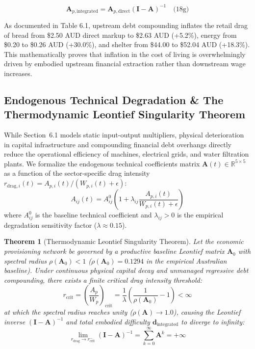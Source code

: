 \documentclass[preprint,12pt,authoryear]{elsarticle}
\newtheorem{theorem}{Theorem}
\theoremstyle{definition}
\begin{document}
$$\mathbf{A}_{p, \text{integrated}} = \mathbf{A}_{p, \text{direct}} (\mathbf{I} - \mathbf{A})^{-1} \quad \text{(18g)}$$

As documented in Table 6.1, upstream debt compounding inflates the retail drag of bread from \$2.50 AUD direct markup to \$2.63 AUD (+5.2\%), energy from \$0.20 to \$0.26 AUD (+30.0\%), and shelter from \$44.00 to \$52.04 AUD (+18.3\%). This mathematically proves that inflation in the cost of living is overwhelmingly driven by embodied upstream financial extraction rather than downstream wage increases.

\subsection{Endogenous Technical Degradation \& The Thermodynamic Leontief Singularity Theorem}

While Section~6.1 models static input-output multipliers, physical deterioration in capital infrastructure and compounding financial debt overhangs directly reduce the operational efficiency of machines, electrical grids, and water filtration plants. We formalize the endogenous technical coefficients matrix $\mathbf{A}(t) \in \mathbb{R}^{5 \times 5}$ as a function of the sector-specific drag intensity $r_{\text{drag}, i}(t) = A_{p,i}(t) / (W_{p,i}(t) + \epsilon)$:
\begin{equation}
A_{ij}(t) = A_{ij}^0 \left(1 + \lambda_{ij} \frac{A_{p,i}(t)}{W_{p,i}(t) + \epsilon}\right) \label{eq:endogenous_A}
\end{equation}
where $A_{ij}^0$ is the baseline technical coefficient and $\lambda_{ij} > 0$ is the empirical degradation sensitivity factor ($\lambda \approx 0.15$).

\begin{theorem}[Thermodynamic Leontief Singularity Theorem]
Let the economic provisioning network be governed by a productive baseline Leontief matrix $\mathbf{A}_0$ with spectral radius $\rho(\mathbf{A}_0) < 1$ ($\rho(\mathbf{A}_0) = 0.1294$ in the empirical Australian baseline). Under continuous physical capital decay and unmanaged regressive debt compounding, there exists a finite critical drag intensity threshold:
\begin{equation}
r_{\text{crit}} = \left(\frac{A_p}{W_p}\right)_{\text{crit}} = \frac{1}{\lambda} \left(\frac{1}{\rho(\mathbf{A}_0)} - 1\right) < \infty \label{eq:r_crit}
\end{equation}
at which the spectral radius reaches unity ($\rho(\mathbf{A}) \to 1.0$), causing the Leontief inverse $(\mathbf{I} - \mathbf{A})^{-1}$ and total embodied difficulty $\mathbf{d}_{\text{integrated}}$ to diverge to infinity:
\begin{equation}
\lim_{r_{\text{drag}} \to r_{\text{crit}}^-} (\mathbf{I} - \mathbf{A})^{-1} = \sum_{k=0}^\infty \mathbf{A}^k = +\infty \label{eq:singularity_limit}
\end{equation}
\end{theorem}
\end{document}
